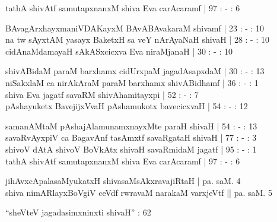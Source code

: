 \begin{entry}
\begin{shl}
tathA shivAtf samutapxnanxM shiva Eva carAcaramf | 97 : - : 6
\end{shl}
\gl{}
\begin{shl}
BAvagArxhayxmaniVDAKayxM BAvABAvakaraM shivamf | 23 : - : 10\\
na tw sAyxtAM yasayx BaketxH sa veY nArAyaNaH shivaH | 28 : - : 10\\
cidAnaMdamayaH sAkASxcicxva Eva niraMjanaH | 30 : - : 10
\end{shl}
\gl{}
\begin{shl}
shivABidaM paraM barxhamx cidUrxpaM jagadAsapxdaM | 30 : - : 13\\
niSakxlaM ca nirAkAraM paraM barxhamx shivABidhamf | 36 : - : 1\\
shiva Eva jagatf savaRM shivAhamitayxpi | 52 : - : 7\\
pAshayuketx BavejijxVvaH pAshamukotx bavecicxvaH | 54 : - : 12
\end{shl}
\gl{}
\begin{shl}
samanAMtaM pAshajAlamunamxnayxMte paraH shivaH | 54 : - : 13\\
savaRvAyxpiV ca BagavAnf tasAmxtf savaRgataH shivaH | 77 : - : 3\\
shivoV dAtA shivoV BoVkAtx shivaH savaRmidaM jagatf | 95 : - : 1\\
tathA shivAtf samutapxnanxM shiva Eva carAcaramf | 97 : - : 6
\end{shl}
\gl{}
\begin{shl}
jihAvxcApalasaMyukatxH shivasaMsAkxravajiRtaH | pa. saM. 4\\
shiva nimARlayxBoVgiV ceVdf rwravaM narakaM varxjeVtf || pa. saM. 5
\end{shl}
\gl{}
\info{}{}{}{}
\begin{shl}
``sheVteV jagadasimxninxti shivaH'' : 62
\end{shl}
\gl{}
\\
\\

\end{entry}
